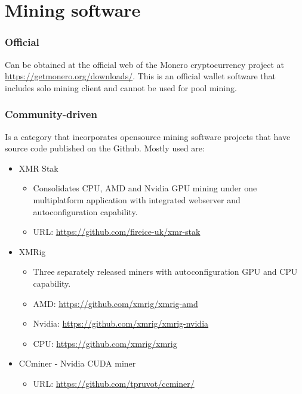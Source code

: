 \documentclass[
  printed, %
  table,   %
  lof,     %
  lot,     %
           oneside, color
]{fithesis3}
\begin{document}
\section{Mining software}
\subsubsection{Official}
Can be obtained at the official web of the Monero cryptocurrency project at \url{https://getmonero.org/downloads/}. This is an official wallet software that includes solo mining client and cannot be used for pool mining.

\subsubsection{Community-driven}
\label{cha:miningsoftware}
Is a category that incorporates opensource mining software projects that have source code published on the Github. Mostly used are:

\begin{itemize}\itemsep0em
\item XMR Stak 
\begin{itemize}\itemsep0em \item Consolidates CPU, AMD and Nvidia GPU mining under one multiplatform application with integrated webserver and autoconfiguration capability. \item URL: \url{https://github.com/fireice-uk/xmr-stak} \end{itemize}
\setlength\itemsep{1em}
\item XMRig 
\setlength\itemsep{0em}
\begin{itemize}\itemsep0em \item Three separately released miners with autoconfiguration GPU and CPU capability. \item AMD: \url{https://github.com/xmrig/xmrig-amd} 
 \item Nvidia: \url{https://github.com/xmrig/xmrig-nvidia} \item CPU: \url{https://github.com/xmrig/xmrig} \end{itemize}
\item CCminer - Nvidia CUDA miner
\begin{itemize}\itemsep0em \item URL: \url{https://github.com/tpruvot/ccminer/} \end{itemize}
\end{itemize}
\end{document}

